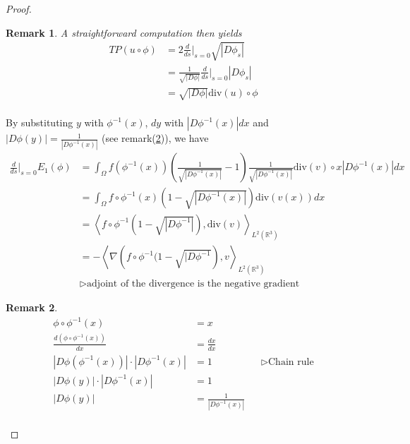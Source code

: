 \documentclass{article}
\theoremstyle{definition}
\theoremstyle{plain}
\newtheorem{remark}{Remark}
\begin{document}
\begin{proof}
\begin{remark}
A straightforward computation then yields
\begin{align*}
    TP(u\circ\phi)&=2\frac{d}{ds}\bigg\rvert_{s=0}\sqrt{|D\phi_s|}\\
    &=\frac{1}{\sqrt{|D\phi|}}\frac{d}{ds}\bigg\rvert_{s=0}|D\phi_s|\\
    &=\sqrt{|D\phi|}\mathrm{div}(u)\circ\phi\\
\end{align*}
\end{remark}

By substituting $y$ with $\phi^{-1}(x)$, $dy$ with $|D\phi^{-1}(x)|dx$ and $|D\phi(y)|=\frac{1}{|D\phi^{-1}(x)|}$ (see remark(\ref{remark:1})), we have
\begin{align*}
    \frac{d}{ds}\bigg\rvert_{s=0}E_1(\phi)&=\int_\Omega f(\phi^{-1}(x))\left(\frac{1}{\sqrt{|D\phi^{-1}(x)|}}-1\right)\frac{1}{\sqrt{|D\phi^{-1}(x)|}}\mathrm{div}(v)\circ x|D\phi^{-1}(x)|dx\\
    &=\int_\Omega f\circ\phi^{-1}(x)(1-\sqrt{|D\phi^{-1}(x)|})\mathrm{div}(v(x))dx\\
    &=\left< f\circ\phi^{-1}(1-\sqrt{|D\phi^{-1}|}),\mathrm{div}(v)\right>_{L^2(\mathbb{R}^3)}\\
    &=-\left<\nabla\left(f\circ\phi^{-1}(1-\sqrt{|D\phi^{-1}}\right),v\right>_{L^2(\mathbb{R}^3)}\\
    &\triangleright\text{adjoint of the divergence is the negative gradient}
\end{align*}

\begin{remark}\label{remark:1}
\begin{align*}
    \phi\circ\phi^{-1}(x)&=x\\
    \frac{d\left(\phi\circ\phi^{-1}(x)\right)}{dx}&=\frac{dx}{dx}\\
    |D\phi(\phi^{-1}(x))|\cdot|D\phi^{-1}(x)|&=1&&\triangleright\text{Chain rule}\\
    |D\phi(y)|\cdot|D\phi^{-1}(x)|&=1\\
    |D\phi(y)|&=\frac{1}{|D\phi^{-1}(x)|}\\
\end{align*}
\end{remark}


\end{proof}
\end{document}
